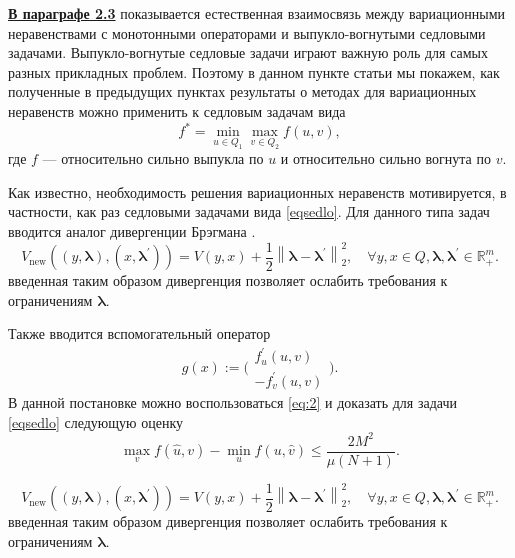 \underline{\textbf{В параграфе 2.3}} показывается естественная взаимосвязь между вариационными неравенствами с монотонными операторами и выпукло-вогнутыми седловыми задачами. Выпукло-вогнутые седловые задачи играют важную роль для самых разных прикладных проблем. Поэтому в данном пункте статьи мы покажем, как полученные в предыдущих пунктах результаты о методах для вариационных неравенств можно применить к седловым задачам вида
\begin{equation}\label{eqsedlo}
    f^* = \min_{u \in Q_1} \max_{v \in Q_2} f(u, v),
\end{equation}
где $f$ --- относительно сильно выпукла по $u$ и относительно сильно вогнута по $v$.

Как известно, необходимость решения вариационных неравенств мотивируется, в частности, как раз седловыми задачами вида \eqref{eqsedlo}. Для данного типа задач вводится аналог дивергенции Брэгмана \cite{Fedor_relative_adapuniv}. 
$$
    V_{\text{new}}\left((y, \boldsymbol{\lambda}), (x, \boldsymbol{\lambda}^{'})\right) = V(y,x) + \frac{1}{2} \left\|\boldsymbol{\lambda} - \boldsymbol{\lambda}^{'}\right\|_2^2, \quad  \forall y, x \in Q, \boldsymbol{\lambda},  \boldsymbol{\lambda}^{'} \in \mathbb{R}_+^m.
$$
введенная таким образом дивергенция позволяет ослабить требования к ограничениям $\boldsymbol{\lambda}$.

Также вводится вспомогательный оператор 
\begin{equation}\label{operator-sedlo}
    g(x) := \Bigg( 
    \begin{aligned}
        f^{'}_{u}(u,v)\\
        -f^{'}_{v}(u,v)
    \end{aligned}
    \Bigg).
\end{equation}
В данной постановке можно воспользоваться \eqref{eq:2} и доказать для задачи \eqref{eqsedlo} следующую оценку
\begin{equation}
    \max_{v} f(\widehat{u}, v) - \min_{u} f(u, \widehat{v}) \leq \frac{2M^2}{\mu (N+1)}.
\end{equation}


\iffalse
    $$
        V_{\text{new}}\left((y, \boldsymbol{\lambda}), (x, \boldsymbol{\lambda}^{'})\right) = V(y,x) + \frac{1}{2} \left\|\boldsymbol{\lambda} - \boldsymbol{\lambda}^{'}\right\|_2^2, \quad  \forall y, x \in Q, \boldsymbol{\lambda},  \boldsymbol{\lambda}^{'} \in \mathbb{R}_+^m.
    $$
    введенная таким образом дивергенция позволяет ослабить требования к ограничениям $\boldsymbol{\lambda}$.

